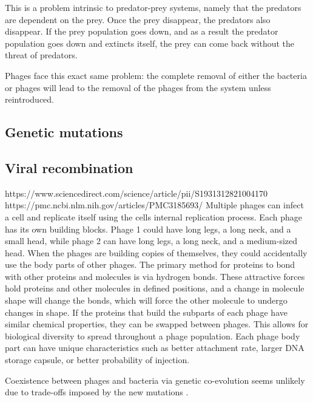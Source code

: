 This is a problem intrinsic to predator-prey systems, namely that the predators are dependent on the prey. 
Once the prey disappear, the predators also disappear. 
If the prey population goes down, and as a result the predator population goes down and extincts itself, the prey can come back without the threat of predators. 

Phages face this exact same problem: the complete removal of either the bacteria or phages will lead to the removal of the phages from the system unless reintroduced. 

\subsection{Genetic mutations}

\subsection{Viral recombination}
https://www.sciencedirect.com/science/article/pii/S1931312821004170
https://pmc.ncbi.nlm.nih.gov/articles/PMC3185693/
Multiple phages can infect a cell and replicate itself using the cells internal replication process. 
Each phage has its own building blocks. 
Phage 1 could have long legs, a long neck, and a small head, while phage 2 can have long legs, a long neck, and a medium-sized head. 
When the phages are building copies of themselves, they could accidentally use the body parts of other phages. 
The primary method for proteins to bond with other proteins and molecules is via hydrogen bonds. 
These attractive forces hold proteins and other molecules in defined positions, and a change in molecule shape will change the bonds, which will force the other molecule to undergo changes in shape. 
If the proteins that build the subparts of each phage have similar chemical properties, they can be swapped between phages. 
This allows for biological diversity to spread throughout a phage population. 
Each phage body part can have unique characteristics such as better attachment rate, larger DNA storage capsule, or better probability of injection. 

Coexistence between phages and bacteria via genetic co-evolution seems unlikely due to trade-offs imposed by the new mutations \cite{bullOptimalityModelsPhage2006}. 


